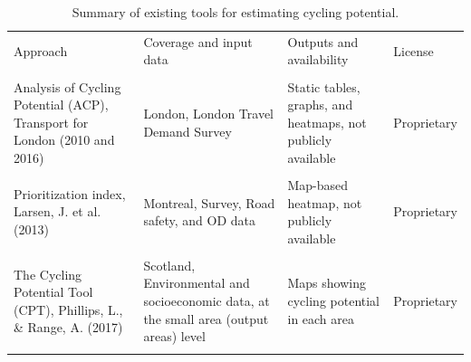 \documentclass[
  super,
  preprint,
  3p]{elsarticle}
\begin{document}
\begin{longtable}[t]{>{\raggedright\arraybackslash}p{13em}>{\raggedright\arraybackslash}p{15em}>{\raggedright\arraybackslash}p{12em}>{\raggedright\arraybackslash}p{5em}}

\caption{\label{tbl-tools}Summary of existing tools for estimating
cycling potential.}

\tabularnewline

\\
\toprule
Approach & Coverage and input data & Outputs and availability & License\\
\midrule
\cellcolor{gray!10}{Bicycle share model, Parkin, J. et al. (2007)} & \cellcolor{gray!10}{England and Wales, Journeys to work OD census data, at the small-area (wards) level} & \cellcolor{gray!10}{Static tables in academic paper} & \cellcolor{gray!10}{Proprietary}\\
Analysis of Cycling Potential (ACP), Transport for London (2010 and 2016) & London, London Travel Demand Survey & Static tables, graphs, and heatmaps, not publicly available & Proprietary\\
\cellcolor{gray!10}{Bikeability index/Bike Score, Winters, M. et al. (2013 and 2016)} & \cellcolor{gray!10}{Metro Vancouver region/160 US and Canadian cities, Cycling infrastructure, topography, destinations and road connectivity data} & \cellcolor{gray!10}{Map-based heatmap, not publicly available} & \cellcolor{gray!10}{Proprietary}\\
Prioritization index, Larsen, J. et al. (2013) & Montreal, Survey, Road safety, and OD data & Map-based heatmap, not publicly available & Proprietary\\
\cellcolor{gray!10}{Usage intensity index, Zhang, D. et al. (2014)} & \cellcolor{gray!10}{Belo Horizonte, Survey, census, and OD data} & \cellcolor{gray!10}{Static tables and maps, not publicly available} & \cellcolor{gray!10}{Proprietary}\\
\addlinespace
The Cycling Potential Tool (CPT), Phillips, L., \& Range, A. (2017) & Scotland, Environmental and socioeconomic data, at the small area (output areas) level & Maps showing cycling potential in each area & Proprietary\\
\cellcolor{gray!10}{Propensity to Cycle Tool (PCT), Lovelace, R. et al. (2017)} & \cellcolor{gray!10}{England and Wales, Journeys to work and school OD census data, at the small area (LSOA) level} & \cellcolor{gray!10}{Online maps, graphs, tables, publicly available at www.pct.bike} & \cellcolor{gray!10}{Open source}\\

\end{longtable}
\end{document}
